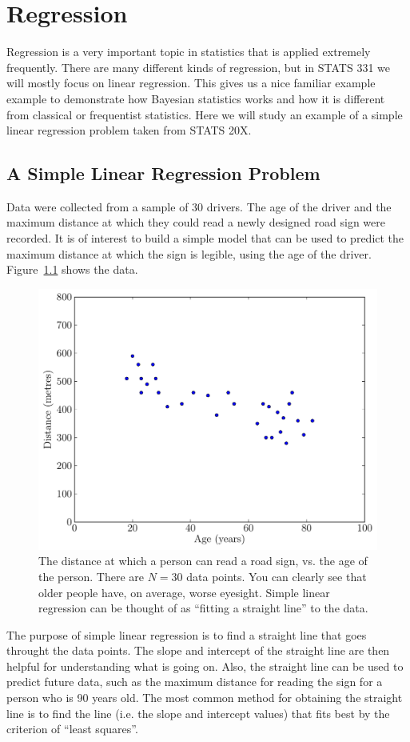 \chapter{Regression}
Regression is a very important topic in statistics that is applied extremely
frequently. There are many different kinds of regression, but in STATS 331 we will
mostly focus on linear regression. This gives us a nice familiar example
example to demonstrate how Bayesian statistics works and how it is different
from classical or frequentist statistics. Here we will study an example of a
simple linear regression problem taken from STATS 20X.

\section{A Simple Linear Regression Problem}
Data were collected from a sample of 30 drivers. The age of the driver and the 
maximum distance at which they could read a newly designed road sign were 
recorded. It is of interest to build a simple model that can be used to predict the 
maximum distance at which the sign is legible, using the age of the driver.
Figure~\ref{fig:road} shows the data.
\begin{figure}
\begin{center}
\includegraphics[scale=0.5]{Figures/road.pdf}
\caption{The distance at which a person can read a road sign, vs. the age of
the person. There are $N=30$ data points. You can clearly see that older people
have, on average, worse eyesight. Simple linear regression can be thought of as
``fitting a straight line'' to the data.
\label{fig:road}}
\end{center}
\end{figure}
The purpose of simple linear regression is to find a straight line that goes
throught the data points. The slope and intercept of the straight line are then
helpful for understanding what is going on. Also, the straight line can be used
to predict future data, such as the maximum distance for reading the sign for a
person who is 90 years old. The most common method for obtaining the straight
line is to find the line (i.e. the slope and intercept values) that fits best
by the criterion of ``least squares''.

